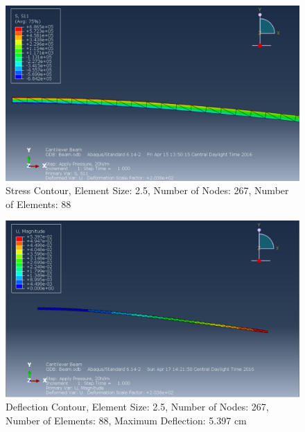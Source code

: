 \documentclass[a4paper]{article}
\begin{document}
\begin{figure}[ht]
\centering
\includegraphics[scale=.5]{6Nsize2_5Stress.PNG}
\caption{Stress Contour, Element Size: 2.5, Number of Nodes: 267, Number of Elements: 88}
\end{figure}
\begin{figure}[ht]
\centering
\includegraphics[scale=.5]{6Nsize2_5MDisplacement.PNG}
\caption{Deflection Contour, Element Size: 2.5, Number of Nodes: 267, Number of Elements: 88, Maximum Deflection: 5.397 cm}
\end{figure}
\end{document}
